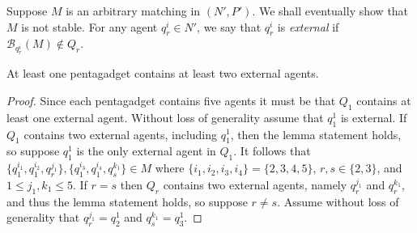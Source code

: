 Suppose $M$ is an arbitrary matching in $(N', P')$. We shall eventually show that $M$ is not stable. For any agent $q_r^i \in N'$, we say that $q_r^i$ is \emph{external} if $\mathscr{B}_{q_r^i}(M) \notin Q_r$.

\begin{lem}
\label{lem:threed_sr_b_ifnis15example_lemma}
At least one pentagadget contains at least two external agents.
\end{lem}
\begin{proof}
Since each pentagadget contains five agents it must be that $Q_1$ contains at least one external agent. Without loss of generality assume that $q_1^1$ is external. If $Q_1$ contains two external agents, including $q_1^1$, then the lemma statement holds, so suppose $q_1^1$ is the only external agent in $Q_1$. It follows that $\{ q_1^{i_1}, q_1^{i_2}, q_r^{j_1} \}, \{ q_1^{i_3}, q_1^{i_4}, q_s^{k_1} \} \in M$ where $\{ i_1, i_2, i_3, i_4 \} = \{ 2, 3, 4, 5 \}$, $r, s \in \{ 2, 3 \}$, and $1\leq {j_1}, {k_1}\leq 5$. If $r = s$ then $Q_r$ contains two external agents, namely $q_r^{j_1}$ and $q_r^{k_1}$, and thus the lemma statement holds, so suppose $r \neq s$. Assume without loss of generality that $q_r^{j_1} = q_2^1$ and $q_s^{k_1} = q_3^1$.


\end{proof}
